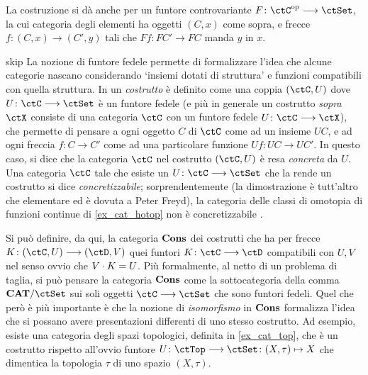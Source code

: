 La costruzione si dà anche per un funtore controvariante \(F \colon \ctC^\op\fun\ctSet\), la cui categoria degli elementi ha oggetti \((C,x)\) come sopra, e frecce \(f \colon (C,x)\to (C',y)\) tali che \(Ff \colon FC'\to FC\) manda \(y\) in \(x\).
\begin{hDigression}{skip}\label{def_costrutto}
 La nozione di funtore fedele permette di formalizzare l'idea che alcune categorie nascano considerando `insiemi dotati di struttura' e funzioni compatibili con quella struttura. In \cite[I.5.1]{acc} un \emph{costrutto} è definito come una coppia \((\ctC,U)\) dove \(U \colon \ctC \fun\ctSet\) è un funtore fedele (e più in generale un costrutto \emph{sopra \(\ctX\)} consiste di una categoria \(\ctC\) con un funtore fedele \(U \colon \ctC\fun\ctX\)), che permette di pensare a ogni oggetto \(C\) di \(\ctC\) come ad un insieme \(UC\), e ad ogni freccia \(f \colon C\to C'\) come ad una particolare funzione \(Uf \colon UC\to UC'\). In questo caso, si dice che la categoria \(\ctC\) nel costrutto \((\ctC,U)\) è resa \emph{concreta} da \(U\). Una categoria \(\ctC\) tale che esiste un \(U \colon \ctC \fun\ctSet\) che la rende un costrutto si dice \emph{concretizzabile}; sorprendentemente (la dimostrazione è tutt'altro che elementare ed è dovuta a Peter Freyd), la categoria delle classi di omotopia di funzioni continue di \ref{ex_cat_hotop} non è concretizzabile \cite{Freydconc}.

 Si può definire, da qui, la categoria \(\mathbf{Cons}\) dei costrutti che ha per frecce \(K \colon (\ctC,U)\fun (\ctD,V)\) quei funtori \(K \colon \ctC\fun\ctD\) compatibili con \(U,V\) nel senso ovvio che \(V\cdot K=U\). Più formalmente, al netto di un problema di taglia, si può pensare la categoria \(\mathbf{Cons}\) come la sottocategoria della comma \(\cate{CAT}/\ctSet\) sui soli oggetti \(\ctC\fun\ctSet\) che sono funtori fedeli. Quel che però è più importante è che la nozione di \emph{isomorfismo} in \(\mathbf{Cons}\) formalizza l'idea che si possano avere presentazioni differenti di uno stesso costrutto. Ad esempio, esiste una categoria degli spazi topologici, definita in \ref{ex_cat_top}, che è un costrutto rispetto all'ovvio funtore \(U \colon \ctTop\fun\ctSet \colon (X,\tau)\mapsto X\) che dimentica la topologia \(\tau\) di uno spazio \((X,\tau)\).


\end{hDigression}
